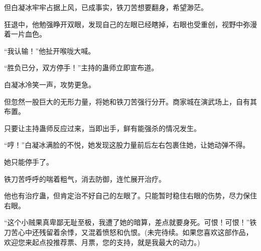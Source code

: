 \begin{this_body}
但白凝冰牢牢占据上风，已成事实，铁刀苦想要翻身，希望渺茫。

狂退中，他勉强睁开双眼，发现自己的左眼已经瞎掉，右眼也受重创，视野中弥漫着一片血色。

“我认输！”他扯开喉咙大喊。

“胜负已分，双方停手！”主持的蛊师立即宣布道。

白凝冰冷笑一声，攻势更急。

但忽然一股巨大的无形力量，将她和铁刀苦强行分开。商家城在演武场上，自有其布置。

只要让主持蛊师反应过来，当即出手，鲜有能强杀的情况发生。

“哼！”白凝冰满脸的不悦，她发现这股力量前后左右包裹住她，让她动弹不得。

她只能停手了。

铁刀苦呼呼的喘着粗气，消去防御，连忙展开治疗。

他也有治疗蛊，但肯定治不好自己的左眼了。只能暂时稳住右眼的伤势，尽力保住右眼。

“这个小贼果真卑鄙无耻至极，我遭了她的暗算，差点就要身死。可恨！可恨！”铁刀苦心中还残留着余悸，又混着愤怒和仇恨。(未完待续。如果您喜欢这部作品，欢迎您来起点投推荐票、月票，您的支持，就是我最大的动力。)

\end{this_body}

